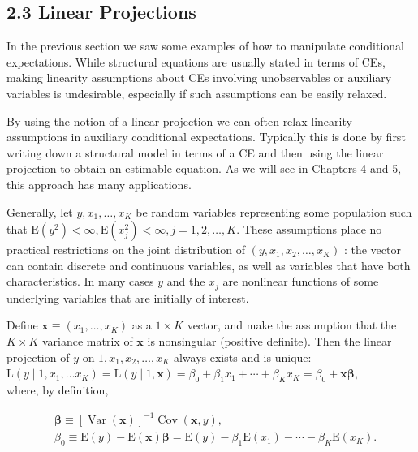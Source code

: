 \documentclass[10pt]{article}
\begin{document}
\subsection*{2.3 Linear Projections}
In the previous section we saw some examples of how to manipulate conditional expectations. While structural equations are usually stated in terms of CEs, making linearity assumptions about CEs involving unobservables or auxiliary variables is undesirable, especially if such assumptions can be easily relaxed.

By using the notion of a linear projection we can often relax linearity assumptions in auxiliary conditional expectations. Typically this is done by first writing down a structural model in terms of a CE and then using the linear projection to obtain an estimable equation. As we will see in Chapters 4 and 5, this approach has many applications.

Generally, let $y, x_{1}, \ldots, x_{K}$ be random variables representing some population such that $\mathrm{E}\left(y^{2}\right)<\infty, \mathrm{E}\left(x_{j}^{2}\right)<\infty, j=1,2, \ldots, K$. These assumptions place no practical restrictions on the joint distribution of $\left(y, x_{1}, x_{2}, \ldots, x_{K}\right)$ : the vector can contain discrete and continuous variables, as well as variables that have both characteristics. In many cases $y$ and the $x_{j}$ are nonlinear functions of some underlying variables that are initially of interest.

Define $\mathbf{x} \equiv\left(x_{1}, \ldots, x_{K}\right)$ as a $1 \times K$ vector, and make the assumption that the $K \times K$ variance matrix of $\mathbf{x}$ is nonsingular (positive definite). Then the linear projection of $y$ on $1, x_{1}, x_{2}, \ldots, x_{K}$ always exists and is unique:\\
$\mathrm{L}\left(y \mid 1, x_{1}, \ldots x_{K}\right)=\mathrm{L}(y \mid 1, \mathbf{x})=\beta_{0}+\beta_{1} x_{1}+\cdots+\beta_{K} x_{K}=\beta_{0}+\mathbf{x} \boldsymbol{\beta}$,\\
where, by definition,


\begin{align*}
& \boldsymbol{\beta} \equiv[\operatorname{Var}(\mathbf{x})]^{-1} \operatorname{Cov}(\mathbf{x}, y),  \tag{2.39}\\
& \beta_{0} \equiv \mathrm{E}(y)-\mathrm{E}(\mathbf{x}) \boldsymbol{\beta}=\mathrm{E}(y)-\beta_{1} \mathrm{E}\left(x_{1}\right)-\cdots-\beta_{K} \mathrm{E}\left(x_{K}\right) . \tag{2.40}
\end{align*}
\end{document}
